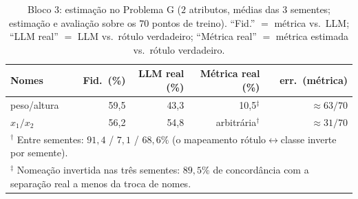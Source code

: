 \documentclass[12pt,a4paper]{article}
\providecommand{\DIFaddbegin}{} %
\providecommand{\DIFaddend}{} %
\providecommand{\DIFdelbegin}{} %
\providecommand{\DIFdelend}{} %
\providecommand{\DIFscaledelfig}{0.5}
\newlength{\DIFdelgraphicswidth} %
\newlength{\DIFdelgraphicsheight} %
\providecommand{\DIFaddincludegraphics}[2][]{{\color{blue}\fbox{\DIFOincludegraphics[#1]{#2}}}} %
\providecommand{\DIFdelincludegraphics}[2][]{%
\sbox{\DIFdelgraphicsbox}{\DIFOincludegraphics[#1]{#2}}%
\settoboxwidth{\DIFdelgraphicswidth}{\DIFdelgraphicsbox} %
\settoboxtotalheight{\DIFdelgraphicsheight}{\DIFdelgraphicsbox} %
\scalebox{\DIFscaledelfig}{%
\parbox[b]{\DIFdelgraphicswidth}{\usebox{\DIFdelgraphicsbox}\\[-\baselineskip] \rule{\DIFdelgraphicswidth}{0em}}\llap{\resizebox{\DIFdelgraphicswidth}{\DIFdelgraphicsheight}{%
\setlength{\unitlength}{\DIFdelgraphicswidth}%
\begin{picture}(1,1)%
\thicklines\linethickness{2pt} %
{\color[rgb]{1,0,0}\put(0,0){\framebox(1,1){}}}%
{\color[rgb]{1,0,0}\put(0,0){\line( 1,1){1}}}%
{\color[rgb]{1,0,0}\put(0,1){\line(1,-1){1}}}%
\end{picture}%
}\hspace*{3pt}}} %
} %
\DeclareRobustCommand{\DIFaddbegin}{\DIFOaddbegin \let\includegraphics\DIFaddincludegraphics} %
\DeclareRobustCommand{\DIFaddend}{\DIFOaddend \let\includegraphics\DIFOincludegraphics} %
\DeclareRobustCommand{\DIFdelbegin}{\DIFOdelbegin \let\includegraphics\DIFdelincludegraphics} %
\DeclareRobustCommand{\DIFdelend}{\DIFOaddend \let\includegraphics\DIFOincludegraphics} %
\begin{document}
\DIFdelbegin %
\DIFdelend \DIFaddbegin \begin{table}[ht]
\centering
\caption{Bloco 3: estimação no Problema G ($2$ atributos, médias das $3$ sementes;
estimação e avaliação sobre os $70$ pontos de treino).
``Fid.'' $=$ métrica vs.\ LLM; ``LLM real'' $=$ LLM vs.\ rótulo verdadeiro; ``Métrica real''
$=$ métrica estimada vs.\ rótulo verdadeiro.}
\label{tab:real_a}
\begin{tabular}{lrrrr}
\toprule
\textbf{Nomes} & \textbf{Fid.\ (\%)} & \textbf{LLM real (\%)} &
\textbf{Métrica real (\%)} & \textbf{err.\ (métrica)} \\
\midrule
peso/altura & 59,5 & 43,3 & 10,5$^\ddagger$ & $\approx 63/70$ \\
$x_1/x_2$   & 56,2 & 54,8 & arbitrária$^\dagger$ & $\approx 31/70$ \\
\bottomrule
\multicolumn{5}{l}{\footnotesize $^\dagger$ Entre sementes: $91{,}4$ / $7{,}1$ / $68{,}6\%$
(o mapeamento rótulo$\leftrightarrow$classe inverte por semente).} \\
\multicolumn{5}{l}{\footnotesize $^\ddagger$ Nomeação invertida nas três sementes:
$89{,}5\%$ de concordância com a separação real a menos da troca de nomes.}
\end{tabular}
\end{table}
\DIFaddend 
\end{document}
